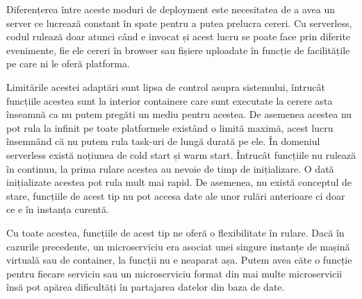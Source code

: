 Diferențerea între aceste moduri de deployment este necesitatea de a avea un server
ce lucrează constant în spate pentru a putea prelucra cereri. Cu serverless, codul rulează
doar atunci când e invocat și acest lucru se poate face prin diferite evenimente, fie ele
cereri în browser sau fișiere uploadate în funcție de facilitățile pe care ni le oferă platforma.

Limitările acestei adaptări sunt lipsa de control asupra sistemului, întrucât funcțiile
acestea sunt la interior containere care sunt executate la cerere asta înseamnă ca nu
putem pregăti un mediu pentru acestea. De asemenea acestea nu pot rula la infinit pe toate platformele
existând o limită maximă, acest lucru însemnând că nu putem rula task-uri de lungă durată pe ele.
În domeniul serverless există noțiunea de cold start și warm start. Întrucât funcțiile nu rulează
în continuu, la prima rulare acestea au nevoie de timp de inițializare. O dată inițializate
acestea pot rula mult mai rapid. De asemenea, nu există conceptul de stare, funcțiile
de acest tip nu pot accesa date ale unor rulări anterioare ci doar ce e în instanța curentă.

Cu toate acestea, funcțiile de acest tip ne oferă o flexibilitate în rulare. Dacă în cazurile
precedente, un microserviciu era asociat unei singure instanțe de mașină virtuală sau
de container, la funcții nu e neaparat așa. Putem avea căte o funcție pentru fiecare
serviciu sau un microserviciu format din mai multe microservicii însă pot apărea dificultăți
în partajarea datelor din baza de date.
